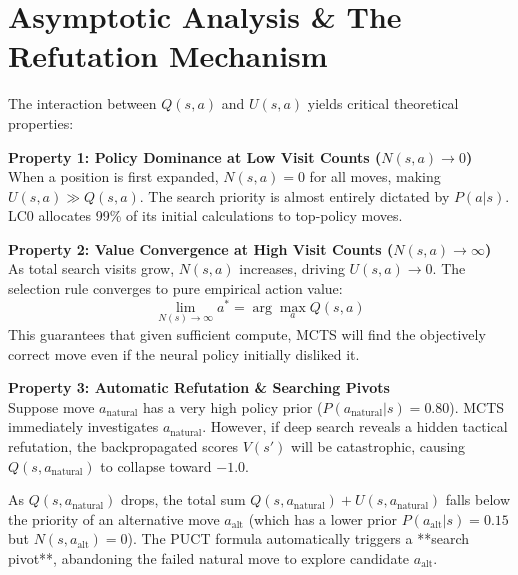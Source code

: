 \documentclass[11pt,a4paper]{report}
\begin{document}
\section{Asymptotic Analysis \& The Refutation Mechanism}
The interaction between $Q(s,a)$ and $U(s,a)$ yields critical theoretical properties:

\begin{mdframed}[backgroundcolor=gray!10]
\textbf{Property 1: Policy Dominance at Low Visit Counts ($N(s,a) \to 0$)}\\
When a position is first expanded, $N(s,a) = 0$ for all moves, making $U(s,a) \gg Q(s,a)$. The search priority is almost entirely dictated by $P(a|s)$. LC0 allocates 99\% of its initial calculations to top-policy moves.
\end{mdframed}

\begin{mdframed}[backgroundcolor=gray!10]
\textbf{Property 2: Value Convergence at High Visit Counts ($N(s,a) \to \infty$)}\\
As total search visits grow, $N(s,a)$ increases, driving $U(s,a) \to 0$. The selection rule converges to pure empirical action value:
\begin{equation}
\lim_{N(s) \to \infty} a^* = \arg\max_{a} Q(s,a)
\end{equation}
This guarantees that given sufficient compute, MCTS will find the objectively correct move even if the neural policy initially disliked it.
\end{mdframed}

\begin{mdframed}[backgroundcolor=gray!10]
\textbf{Property 3: Automatic Refutation \& Searching Pivots}\\
Suppose move $a_{\text{natural}}$ has a very high policy prior ($P(a_{\text{natural}}|s) = 0.80$). MCTS immediately investigates $a_{\text{natural}}$. However, if deep search reveals a hidden tactical refutation, the backpropagated scores $V(s')$ will be catastrophic, causing $Q(s,a_{\text{natural}})$ to collapse toward $-1.0$.

As $Q(s,a_{\text{natural}})$ drops, the total sum $Q(s,a_{\text{natural}}) + U(s,a_{\text{natural}})$ falls below the priority of an alternative move $a_{\text{alt}}$ (which has a lower prior $P(a_{\text{alt}}|s) = 0.15$ but $N(s,a_{\text{alt}}) = 0$). The PUCT formula automatically triggers a **search pivot**, abandoning the failed natural move to explore candidate $a_{\text{alt}}$.
\end{mdframed}
\end{document}
